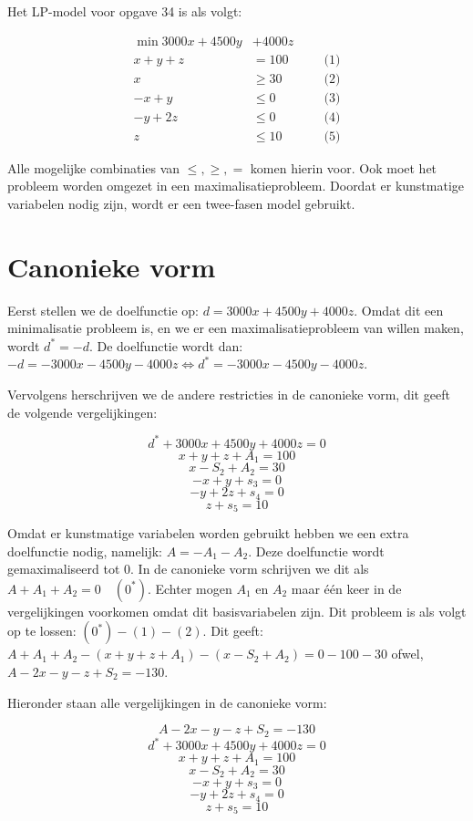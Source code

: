 \documentclass[11pt]{article}
\begin{document}
    Het LP-model voor opgave 34 is als volgt:

\[ \begin{aligned}
\min 3000x+4500y&+4000z\\
x+y+z &= 100 \qquad&\text{(1)} \\
x &\geq 30 \qquad&\text{(2)} \\
-x+y &\leq 0 \qquad&\text{(3)} \\
-y+2z &\leq 0 \qquad&\text{(4)}\\
z &\leq 10 \qquad&\text{(5)}
\end{aligned}\]

    Alle mogelijke combinaties van \(\leq, \geq, =\) komen hierin voor. Ook
moet het probleem worden omgezet in een maximalisatieprobleem. Doordat
er kunstmatige variabelen nodig zijn, wordt er een twee-fasen model
gebruikt.

    \hypertarget{canonieke-vorm}{%
\section{Canonieke vorm}\label{canonieke-vorm}}

    Eerst stellen we de doelfunctie op: \(d=3000x+4500y+4000z\). Omdat dit
een minimalisatie probleem is, en we er een maximalisatieprobleem van
willen maken, wordt \(d^*=-d\). De doelfunctie wordt dan:
\(-d=-3000x-4500y-4000z \iff d^*=-3000x-4500y-4000z\).

Vervolgens herschrijven we de andere restricties in de canonieke vorm,
dit geeft de volgende vergelijkingen:

\[ \tag{0} d^*+3000x+4500y+4000z = 0 \] \[ \tag{1} x+y+z+A_1=100 \]
\[ \tag{2} x-S_2+A_2=30 \] \[ \tag{3} -x+y+s_3=0 \]
\[ \tag{4} -y+2z+s_4=0 \] \[ \tag{5} z+s_5=10 \]

    Omdat er kunstmatige variabelen worden gebruikt hebben we een extra
doelfunctie nodig, namelijk: \(A=-A_1-A_2\). Deze doelfunctie wordt
gemaximaliseerd tot \(0\). In de canonieke vorm schrijven we dit als
\(A+A_1+A_2=0 \quad(0^*)\). Echter mogen \(A_1\) en \(A_2\) maar één
keer in de vergelijkingen voorkomen omdat dit basisvariabelen zijn. Dit
probleem is als volgt op te lossen: \((0^*)-(1)-(2)\). Dit geeft:
\(A+A_1+A_2-(x+y+z+A_1)-(x-S_2+A_2)=0-100-30\) ofwel,
\(A-2x-y-z+S_2=-130\).

Hieronder staan alle vergelijkingen in de canonieke vorm:

\[ \tag{0*} A-2x-y-z+S_2=-130 \] \[ \tag{0} d^*+3000x+4500y+4000z = 0 \]
\[ \tag{1} x+y+z+A_1=100 \] \[ \tag{2} x-S_2+A_2=30 \]
\[ \tag{3} -x+y+s_3=0 \] \[ \tag{4} -y+2z+s_4=0 \]
\[ \tag{5} z+s_5=10 \]
\end{document}
